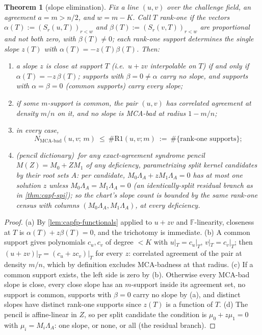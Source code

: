 \documentclass[11pt]{article}
\newtheorem{theorem}{Theorem}[section]
\theoremstyle{definition}
\theoremstyle{remark}
\newcommand{\F}{\mathbb{F}}
\begin{document}
\begin{theorem}[slope elimination]\label{thm:capfp-slope-elim}
Fix a line $(u,v)$ over the challenge field, an agreement $a=m>n/2$, and $w=m-K$.  Call $T$ \emph{rank-one} if the vectors $\alpha(T):=(S_r(u,T))_{r<w}$ and $\beta(T):=(S_r(v,T))_{r<w}$ are proportional and not both zero, with $\beta(T)\ne0$; each rank-one support determines the single slope $z(T)$ with $\alpha(T)=-z(T)\beta(T)$.  Then:
\begin{enumerate}[label=\textup{(\alph*)}]
\item a slope $z$ is close at support $T$ \textup(i.e.\ $u+zv$ interpolable on $T$\textup) if and only if $\alpha(T)=-z\,\beta(T)$; supports with $\beta=0\ne\alpha$ carry no slope, and supports with $\alpha=\beta=0$ \textup(\emph{common} supports\textup) carry every slope;
\item if some $m$-support is common, the pair $(u,v)$ has correlated agreement at density $m/n$ on it, and \emph{no} slope is MCA-bad at radius $1-m/n$;
\item in every case,
\[
        N_{\mathrm{MCA\text{-}bad}}(u,v;\,m)\ \le\ \#\mathrm{R1}(u,v;m)\ :=\ \#\{\text{rank-one supports}\};
\]
\item \textup(pencil dictionary\textup)\ for any exact-agreement syndrome pencil $M(Z)=M_0+ZM_1$ of \emph{any} deficiency, parametrizing split kernel candidates by their root sets $A$: per candidate, $M_0\Lambda_A+zM_1\Lambda_A=0$ has at most one solution $z$ unless $M_0\Lambda_A=M_1\Lambda_A=0$ \textup(an identically-split residual branch as in \cref{thm:capf-spi}\textup); so the chart's slope count is bounded by the same rank-one census with columns $(M_0\Lambda_A,M_1\Lambda_A)$, at every deficiency.
\end{enumerate}
\end{theorem}

\begin{proof}
\textup{(a)}  By \cref{lem:capfp-functionals} applied to $u+zv$ and $\F$-linearity, closeness at $T$ is $\alpha(T)+z\beta(T)=0$, and the trichotomy is immediate.
\textup{(b)}  A common support gives polynomials $c_u,c_v$ of degree $<K$ with $u|_T=c_u|_T$, $v|_T=c_v|_T$; then $(u+zv)|_T=(c_u+zc_v)|_T$ for every $z$: correlated agreement of the pair at density $m/n$, which by definition excludes MCA-badness at that radius.
\textup{(c)}  If a common support exists, the left side is zero by \textup{(b)}.  Otherwise every MCA-bad slope is close, every close slope has an $m$-support inside its agreement set, no support is common, supports with $\beta=0$ carry no slope by \textup{(a)}, and distinct slopes have distinct rank-one supports since $z(T)$ is a function of $T$.
\textup{(d)}  The pencil is affine-linear in $Z$, so per split candidate the condition is $\mu_0+z\mu_1=0$ with $\mu_i=M_i\Lambda_A$: one slope, or none, or all \textup(the residual branch\textup).
\end{proof}
\end{document}
